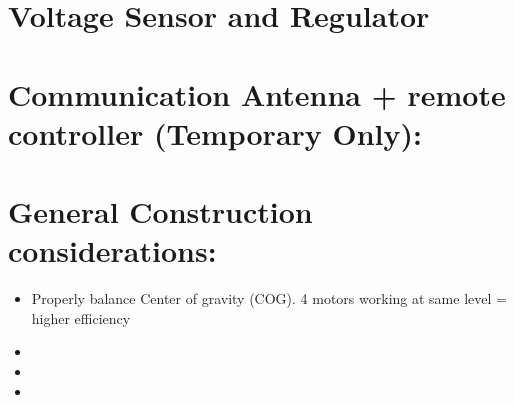 \section{Voltage Sensor and Regulator}
	

\section{Communication Antenna + remote  controller (Temporary Only):}

\section{General Construction considerations:}
\begin{itemize}
	\item Properly balance Center of gravity (COG). 4 motors working at same level = higher efficiency
	\item 
	\item 
	\item 
\end{itemize}

	



























